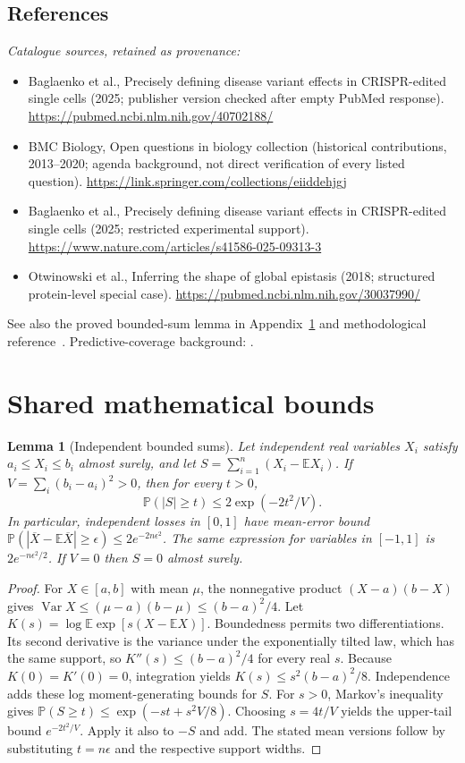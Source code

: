 \documentclass[11pt]{article}
\newcommand{\E}{\mathbb E}
\newcommand{\Prob}{\mathbb P}
\DeclareMathOperator{\Var}{Var}
\providecommand{\E}{\mathbb E}
\providecommand{\Prob}{\mathbb P}
\providecommand{\Var}{\operatorname{Var}}
\newtheorem{sharedlemma}{Lemma}[section]
\begin{document}
\subsection{References}
\noindent\emph{Catalogue sources, retained as provenance:}
\begin{itemize}
\item Baglaenko et al., Precisely defining disease variant effects in CRISPR-edited single cells (2025; publisher version checked after empty PubMed response). \url{https://pubmed.ncbi.nlm.nih.gov/40702188/}
\item BMC Biology, Open questions in biology collection (historical contributions, 2013--2020; agenda background, not direct verification of every listed question). \url{https://link.springer.com/collections/eiiddehjgj}
\item Baglaenko et al., Precisely defining disease variant effects in CRISPR-edited single cells (2025; restricted experimental support). \url{https://www.nature.com/articles/s41586-025-09313-3}
\item Otwinowski et al., Inferring the shape of global epistasis (2018; structured protein-level special case). \url{https://pubmed.ncbi.nlm.nih.gov/30037990/}
\end{itemize}
\noindent See also the proved bounded-sum lemma in Appendix~\ref{app:bounds} and methodological reference~\cite{hoeffding}.
\noindent Predictive-coverage background: \cite{lei}.
\clearpage


\appendix
\section{Shared mathematical bounds}\label{app:bounds}
\begin{sharedlemma}[Independent bounded sums]\label{lem:bounded}
Let independent real variables $X_i$ satisfy $a_i\leq X_i\leq b_i$ almost surely,
and let $S=\sum_{i=1}^n(X_i-\E X_i)$. If
$V=\sum_i(b_i-a_i)^2>0$, then for every $t>0$,
\[
 \Prob(|S|\geq t)\leq 2\exp(-2t^2/V).
\]
In particular, independent losses in $[0,1]$ have mean-error bound
$\Prob(|\overline X-\E\overline X|\geq\epsilon)
\leq2e^{-2n\epsilon^2}$. The same expression for variables in $[-1,1]$
is $2e^{-n\epsilon^2/2}$. If $V=0$ then $S=0$ almost surely.
\end{sharedlemma}
\begin{proof}
For $X\in[a,b]$ with mean $\mu$, the nonnegative product
$(X-a)(b-X)$ gives
$\Var X\leq(\mu-a)(b-\mu)\leq(b-a)^2/4$.
Let $K(s)=\log\E\exp[s(X-\E X)]$.
Boundedness permits two differentiations. Its second derivative is the variance
under the exponentially tilted law, which has the same support, so
$K''(s)\leq(b-a)^2/4$ for every real $s$.
Because $K(0)=K'(0)=0$, integration yields
$K(s)\leq s^2(b-a)^2/8$.
Independence adds these log moment-generating bounds for $S$.
For $s>0$, Markov's inequality gives
$\Prob(S\geq t)\leq\exp(-st+s^2V/8)$.
Choosing $s=4t/V$ yields the upper-tail bound $e^{-2t^2/V}$.
Apply it also to $-S$ and add. The stated mean versions follow by substituting
$t=n\epsilon$ and the respective support widths.
\end{proof}
\end{document}
